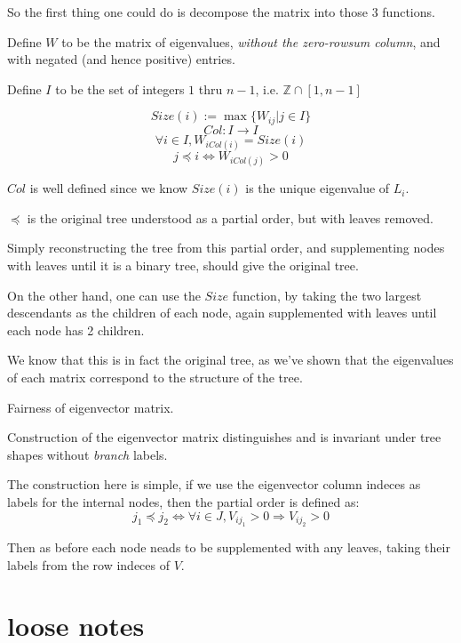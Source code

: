 \documentclass[10pt,a4paper]{report}
\begin{document}
So the first thing one could do is decompose the matrix into those 3 functions.

Define $W$ to be the matrix of eigenvalues, \emph{without the zero-rowsum
column}, and with negated (and hence positive) entries.

Define $I$ to be the set of integers $1$ thru $n-1$, i.e. $\mathds{Z} \cap [1,
n-1]$

\[\mathit{Size}(i) := \max\{W_{ij} | j \in I\}\]
\[\mathit{Col}: I \rightarrow I\]
\[\forall i \in I, W_{i \mathit{Col}(i)} = \mathit{Size}(i)\]
\[j \preccurlyeq i \Leftrightarrow W_{i \mathit{Col}(j)} > 0\]

$\mathit{Col}$ is well defined since we know $\mathit{Size}(i)$ is the unique
eigenvalue of $L_i$.

$\preccurlyeq$ is the original tree understood as a partial order, but with
leaves removed.

Simply reconstructing the tree from this partial order, and supplementing nodes
with leaves until it is a binary tree, should give the original tree.

On the other hand, one can use the $\mathit{Size}$ function, by taking the two
largest descendants as the children of each node, again supplemented with
leaves until each node has 2 children.

We know that this is in fact the original tree, as we've shown that the
eigenvalues of each matrix correspond to the structure of the tree.

\begin{theorem-wip} Fairness of eigenvector matrix.

	Construction of the eigenvector matrix distinguishes and is invariant under tree shapes without \emph{branch} labels.
\end{theorem-wip}

The construction here is simple, if we use the eigenvector column indeces as
labels for the internal nodes, then the partial order is defined as:
\[j_1 \preccurlyeq j_2 \Leftrightarrow \forall i \in J, V_{ij_1} > 0
\Rightarrow V_{ij_2} > 0 \]

Then as before each node neads to be supplemented with any leaves, taking their
labels from the row indeces of $V$.

\chapter{loose notes}
\end{document}
